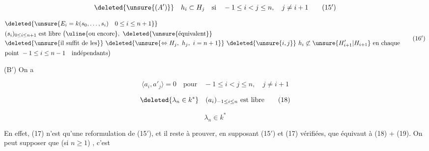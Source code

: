 \[\deleted{\unsure{(A')}}\quad h_i\subset H_j\quad\text{si}\quad -1\leq i<j\leq n,\quad j\ne i+1\tag*{(15$'$)}\]

\[\begin{aligned}&\deleted{\unsure{E_i=k(s_0,\ldots,s_{i})\quad 0\leq i\leq n+1}}\\ & (s_i)_{0\leq i\leq n+1}\text{ est libre }\bigl(\uline{\text{ou encore}},\ \deleted{\unsure{\text{équivalent}}}\\ &\deleted{\unsure{\text{il suffit de les}}}\ \deleted{\unsure{\Leftrightarrow H_j,\ h_j,\ i=n+1}}\ \deleted{\unsure{i,j}}\ h_i\not\subset \unsure{H'_{i+1}|H_{i+1}}\text{ en chaque}\\ &\text{point }-1\leq i\leq n-1\quad\text{indépendants}\bigr)\end{aligned}\tag*{(16$'$)}\]

(B$'$) On a

\[\langle a_i,a'_j\rangle=0\quad\text{pour}\quad-1\leq i<j\leq n,\quad j\ne i+1\tag*{(17)}\]

\[\deleted{\lambda_n\in k^*}\quad(a_i)_{-1\leq i\leq n}\text{ est libre}\tag*{(18)}\]

\[\lambda_n\in k^*\tag*{(19)}\]



En effet, (17) n'est qu'une reformulation de (15$'$), et il reste à prouver, en supposant (15$'$) et (17) vérifiées, que  équivaut à (18) + (19).  On peut supposer que  (si $n\geq1$) , c'est


